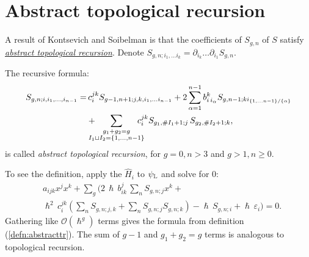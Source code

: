     
    
    
    
    \section{Abstract topological recursion}
    \label{sec:abstract_top_rec}
    
    A result of Kontsevich and Soibelman \cite{ks_airy} is that the coefficients of \(S_{g,n}\) of \(S\) satisfy \emph{\hyperref[defn:abstracttr]{abstract topological recursion}}. Denote \(S_{g,n;i_1, \dots i_k} = \partial_{i_k} \dots \partial_{i_1} S_{g,n}\).
    
    \begin{defn} 
    \label{defn:abstracttr}
    The recursive formula:
    \begin{align*}
        S_{g,n;i,i_1,\dots,i_{n-1}} =&  \, c^{jk}_i S_{g-1,n+1;j,k,i_1, \dots i_{n-1}} +  2 \sum_{\alpha = 1 }^{n-1} b^k_{i \, i_\alpha} S_{g,n-1;k i_{\{1,\dots n-1\}/\{\alpha\}}}  \\
        &+ \hspace{-10pt} \sum_{\substack{g_1 + g_2 = g \\ I_1 \sqcup I_2 = \{1, \dots, n-1\}} } \hspace{-10pt} c^{jk}_i S_{g_1, \# I_1 + 1; j}\, S_{g_2, \# I_2+1;k} , 
    \end{align*}
    is called \emph{abstract topological recursion}, for \(g=0,n>3\) and \(g>1,n\geq 0\).
    \end{defn}
    
    To see the definition, apply the \( \widehat{H}_i\) to \(\psi_{\mathbb{L}} \)  and solve for \(0 \): 
    \begin{align*}
        & a_{ijk} x^j x^k + \sum_g \bigg( 2 \, \hslash\, b_{ik}^{j}\, \sum_n  S_{g,n;j} x^k + \\
        &\hslash^2 \, c_i^{jk}  \left(\sum_n S_{g,n;j,k} + \sum_n S_{g,n;j} S_{g,n;k} \right) - \hslash \, S_{g,n;i} + \hslash \,\varepsilon_i \bigg)  = 0.
    \end{align*} 
    Gathering like \(\mathcal{O}(\hslash^g)\) terms gives the formula from definition (\ref{defn:abstracttr}). The sum of \(g-1\) and \(g_1+g_2 = g\) terms is analogous to topological recursion. 


